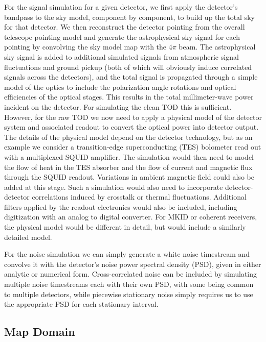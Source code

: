 For the signal simulation for a given detector, we first apply the detector's bandpass to the sky model, component by component, to build up the total sky for that detector. We then reconstruct the detector pointing from the overall telescope pointing model and generate the astrophysical sky signal for each pointing by convolving the sky model map with the $4 \pi$ beam. The astrophysical sky signal is added to additional simulated signals from atmospheric signal fluctuations and ground pickup (both of which will obviously induce correlated signals across the detectors), and the total signal is propagated through a simple model of the optics to include the polarization angle rotations and optical efficiencies of the optical stages. This results in the total millimeter-wave power incident on the detector. For simulating the clean TOD this is sufficient. However, for the raw TOD we now need to apply a physical model of the detector system and associated readout to convert the optical power into detector output. The details of the physical model depend on the detector technology, but as an example we consider a transition-edge superconducting (TES) bolometer read out with a multiplexed SQUID amplifier. The simulation would then need to model the flow of heat in the TES absorber and the flow of current and magnetic flux through the SQUID readout. Variations in ambient magnetic field could also be added at this stage. Such a simulation would also need to incorporate detector-detector correlations induced by crosstalk or thermal fluctuations.  Additional filters applied by the readout electronics would also be included, including digitization with an analog to digital converter. For MKID or coherent receivers, the physical model would be different in detail, but would include a similarly detailed model.

For the noise simulation we can simply generate a white noise timestream and convolve it with the detector's noise power spectral density (PSD), given in either analytic or numerical form. Cross-correlated noise can be included by simulating multiple noise timestreams each with their own PSD, with some being common to multiple detectors, while piecewise stationary noise simply requires us to use the appropriate PSD for each stationary interval.

\subsection{Map Domain}

